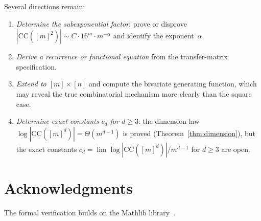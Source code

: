\documentclass[11pt,a4paper]{article}
\theoremstyle{plain}
\theoremstyle{definition}
\theoremstyle{remark}
\newcommand{\CC}{\mathrm{CC}}
\begin{document}
Several directions remain:
\begin{enumerate}[nosep]
\item \emph{Determine the subexponential factor}: prove or disprove $|\CC([m]^2)| \sim C \cdot 16^m \cdot m^{-\alpha}$ and identify the exponent~$\alpha$.
\item \emph{Derive a recurrence or functional equation} from the transfer-matrix specification.
\item \emph{Extend to $[m] \times [n]$} and compute the bivariate generating function, which may reveal the true combinatorial mechanism more clearly than the square case.
\item \emph{Determine exact constants $c_d$ for $d \geq 3$}: the dimension law $\log|\CC([m]^d)| = \Theta(m^{d-1})$ is proved (Theorem~\ref{thm:dimension}), but the exact constants $c_d = \lim \log|\CC([m]^d)|/m^{d-1}$ for $d \geq 3$ are open.
\end{enumerate}


\section*{Acknowledgments}

The formal verification builds on the Mathlib library~\cite{mathlib}.
\end{document}

